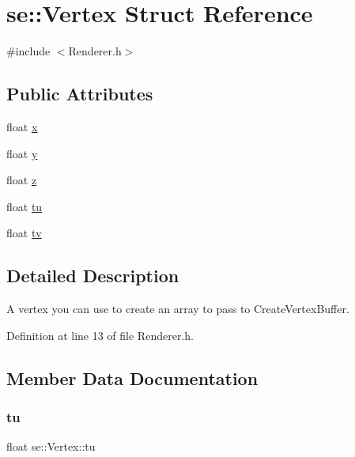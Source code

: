 \hypertarget{structse_1_1_vertex}{}\section{se\+:\+:Vertex Struct Reference}
\label{structse_1_1_vertex}


{\ttfamily \#include $<$Renderer.\+h$>$}

\subsection*{Public Attributes}
\begin{DoxyCompactItemize}
\item 
float \mbox{\hyperlink{structse_1_1_vertex_a861f929c19a2002c84cc45937af25ccd}{x}}
\item 
float \mbox{\hyperlink{structse_1_1_vertex_a6e79ab7f589edb89969385db39405297}{y}}
\item 
float \mbox{\hyperlink{structse_1_1_vertex_a2a709adb9f77c1611363a550e658983b}{z}}
\item 
float \mbox{\hyperlink{structse_1_1_vertex_a8c002af2126ae5cd8dac03ec2adcb060}{tu}}
\item 
float \mbox{\hyperlink{structse_1_1_vertex_abd48156d7a9e157ca38d4c4de2101524}{tv}}
\end{DoxyCompactItemize}


\subsection{Detailed Description}
A vertex you can use to create an array to pass to Create\+Vertex\+Buffer. 

Definition at line 13 of file Renderer.\+h.



\subsection{Member Data Documentation}
\mbox{\label{structse_1_1_vertex_a8c002af2126ae5cd8dac03ec2adcb060}} 
\subsubsection{\texorpdfstring{tu}{tu}}
{\footnotesize\ttfamily float se\+::\+Vertex\+::tu}



